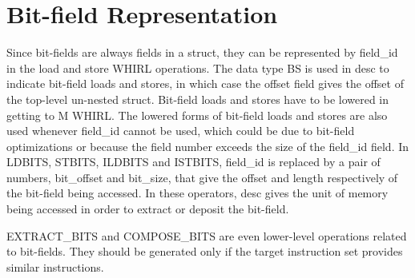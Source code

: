 \documentclass{article}
\begin{document}
\section{Bit-field Representation}

Since bit-fields are always fields in a struct, they can be
represented by field\_id in the load and store WHIRL operations. The
data type BS is used in desc to indicate bit-field loads and stores, in which case
the offset field gives the offset of the top-level un-nested struct.
Bit-field loads and stores have to be lowered in getting to M WHIRL.
The lowered forms of bit-field loads and stores are also used whenever
field\_id cannot be used, which could be due to bit-field optimizations
or because the field number exceeds the size of the field\_id field.
In
LDBITS, STBITS, ILDBITS and ISTBITS, field\_id is replaced by a pair
of numbers, bit\_offset and bit\_size, that give the offset and length
respectively of the
bit-field being accessed. In these operators, desc gives the unit
of memory being accessed in order to extract or deposit the
bit-field.

EXTRACT\_BITS and COMPOSE\_BITS are even lower-level operations
related to bit-fields. They should be generated only if the target
instruction set provides similar instructions. 
\end{document}
